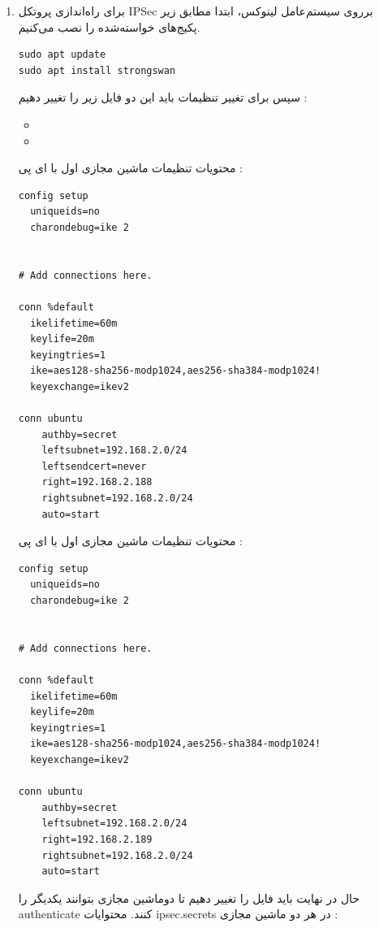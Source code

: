\begin{enumerate}[label=\alph*)]
\begin{itemize}
    \end{itemize}

\item 
برای راه‌اندازی پروتکل IPSec 
برروی سیستم‌عامل لینوکس، ابتدا مطابق زیر پکیج‌های خواسته‌شده را 
نصب می‌کنیم.
\begin{latin}
  \begin{lstlisting}
sudo apt update
sudo apt install strongswan
\end{lstlisting}
\end{latin}
سپس برای تغییر تنظیمات باید این دو فایل زیر را تغییر دهیم : 
\begin{itemize}
  \item {}
  \item {}
\end{itemize}
محتویات تنظیمات ماشین مجازی اول با ای پی 
\textbf{} : 
\begin{latin}
  \begin{lstlisting}
config setup
  uniqueids=no
  charondebug=ike 2


# Add connections here.

conn %default
  ikelifetime=60m
  keylife=20m
  keyingtries=1
  ike=aes128-sha256-modp1024,aes256-sha384-modp1024!
  keyexchange=ikev2

conn ubuntu
    authby=secret
    leftsubnet=192.168.2.0/24
    leftsendcert=never
    right=192.168.2.188
    rightsubnet=192.168.2.0/24
    auto=start
\end{lstlisting}
\end{latin}
محتویات تنظیمات ماشین مجازی اول با ای پی 
\textbf{} : 
\begin{latin}
  \begin{lstlisting}
config setup
  uniqueids=no
  charondebug=ike 2


# Add connections here.

conn %default
  ikelifetime=60m
  keylife=20m
  keyingtries=1
  ike=aes128-sha256-modp1024,aes256-sha384-modp1024!
  keyexchange=ikev2

conn ubuntu
    authby=secret
    leftsubnet=192.168.2.0/24
    right=192.168.2.189
    rightsubnet=192.168.2.0/24
    auto=start
\end{lstlisting}
\end{latin}
حال در نهایت باید فایل 
را تغییر دهیم تا دوماشین مجازی بتوانند یکدیگر را 
authenticate کنند.
محتوایات ipsec.secrets در هر دو ماشین مجازی : 



\end{enumerate}
